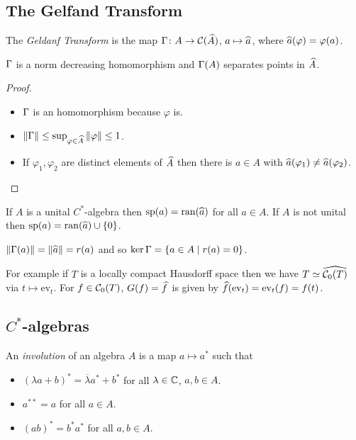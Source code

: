 \subsection{The Gelfand Transform}
\begin{definition}
 The \emph{Geldanf Transform} is the map $\Gamma\colon A\to\mathcal{C}(\widehat{A})$, $a\mapsto\widehat{a}$, where $\widehat{a}(\varphi)=\varphi(a)$.
\end{definition}
\begin{theorem}
 $\Gamma$ is a norm decreasing homomorphism and $\Gamma(A)$ separates points in $\widehat{A}$.
\end{theorem}
\begin{proof}\noindent
 \begin{itemize}
  \item $\Gamma$ is an homomorphism because $\varphi$ is.
  \item $\|\Gamma\|\leq\sup_{\varphi\in\widehat{A}}\|\varphi\|\leq 1$.
  \item If $\varphi_1,\varphi_2$ are distinct elements of $\widehat{A}$ then there is $a\in A$ with $\widehat{a}(\varphi_1)\neq\widehat{a}(\varphi_2)$.
 \end{itemize}
\end{proof}

\begin{proposition}
 If $A$ is a unital $C^\ast$-algebra then $\mathrm{sp}(a)=\mathrm{ran}(\widehat{a})$ for all $a\in A$. If $A$ is not unital then $\mathrm{sp}(a)=\mathrm{ran}(\widehat{a})\cup\{0\}$.
\end{proposition}
\begin{corollary}
 $\|\Gamma(a)\|=\|\widehat{a}\|=r(a)$ and so $\ker\Gamma=\{a\in A\mid r(a)=0\}$.
\end{corollary}

\noindent For example if $T$ is a locally compact Hausdorff space then we have $T\simeq \widehat{\mathcal{C}_0(T)}$ via $t\mapsto \mathrm{ev}_t$. For $f\in\mathcal{C}_0(T)$, $G(f)=\widehat{f}$ is given by $\widehat{f}(\mathrm{ev}_t)=\mathrm{ev}_t(f)=f(t)$. 

\subsection{$C^\ast$-algebras}
\begin{definition}
 An \emph{involution} of an algebra $A$ is a map $a\mapsto a^\ast$ such that 
 \begin{itemize}
  \item $(\lambda a+b)^\ast=\overline{\lambda}a^\ast+b^\ast$ for all $\lambda\in\mathbb{C}$, $a,b\in A$.
  \item $a^{\ast\ast}=a$ for all $a\in A$.
  \item $(ab)^\ast=b^\ast a^\ast$ for all $a,b\in A$.
 \end{itemize}
\end{definition}

